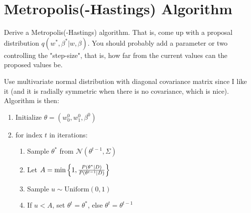 \documentclass[12pt]{article}
\begin{document}
\section{Metropolis(-Hastings) Algorithm}
    \begin{tcolorbox}
        Derive a Metropolis(-Hastings) algorithm. That is, come up with a proposal distribution $q(w^*,\beta^*|w,\beta).$ You should probably add a parameter or two controlling the "step-size", that is, how far from the current values can the proposed values be.
    \end{tcolorbox}
    Use multivariate normal distribution with diagonal covariance matrix since I like it (and it is radially symmetric when there is no covariance, which is nice). Algorithm is then:
    \begin{enumerate}
        \item Initialize $\theta = (w_0^0, w_1^0, \beta^0)$
        \item for index $t$ in iterations:
        \begin{enumerate}[label*={\arabic*.}]
            \item Sample $\theta^*$ from $\mathcal{N}(\theta^{t-1}, \Sigma)$
            \item Let $A = \min \left\{1, \frac{P(\theta^*|D)}{P(\theta^{t-1}|D)}\right\}$
            \item Sample $u \sim \operatorname{Uniform(0,1)}$
            \item If $u < A$, set $\theta^t = \theta^*$, else $\theta^t = \theta^{t-1}$  
        \end{enumerate}
    \end{enumerate}
\end{document}
